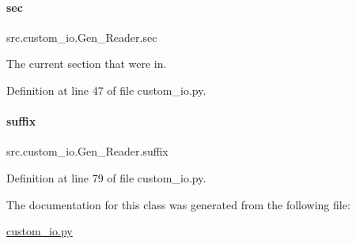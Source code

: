 \paragraph{\texorpdfstring{sec}{sec}}
{\footnotesize\ttfamily src.\+custom\+\_\+io.\+Gen\+\_\+\+Reader.\+sec}



The current section that we\textquotesingle{}re in. 



Definition at line 47 of file custom\+\_\+io.\+py.

\mbox{\label{classsrc_1_1custom__io_1_1Gen__Reader_ada076d5cafe10b9f4fcf7466381816e5}} 
\paragraph{\texorpdfstring{suffix}{suffix}}
{\footnotesize\ttfamily src.\+custom\+\_\+io.\+Gen\+\_\+\+Reader.\+suffix}



Definition at line 79 of file custom\+\_\+io.\+py.



The documentation for this class was generated from the following file\+:\begin{DoxyCompactItemize}
\item 
\hyperlink{custom__io_8py}{custom\+\_\+io.\+py}\end{DoxyCompactItemize}
